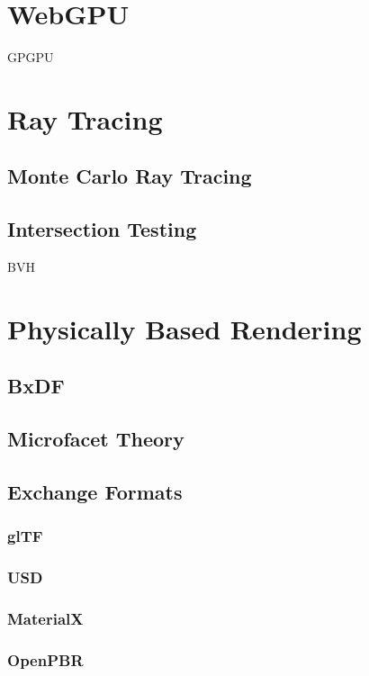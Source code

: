 
\section{WebGPU}
GPGPU
\section{Ray Tracing}
\subsection{Monte Carlo Ray Tracing}
\subsection{Intersection Testing}
BVH

\section{Physically Based Rendering}
\subsection{BxDF}
\subsection{Microfacet Theory}
\subsection{Exchange Formats}
\subsubsection{glTF}
\subsubsection{USD}

\subsubsection{MaterialX}
\subsubsection{OpenPBR}
